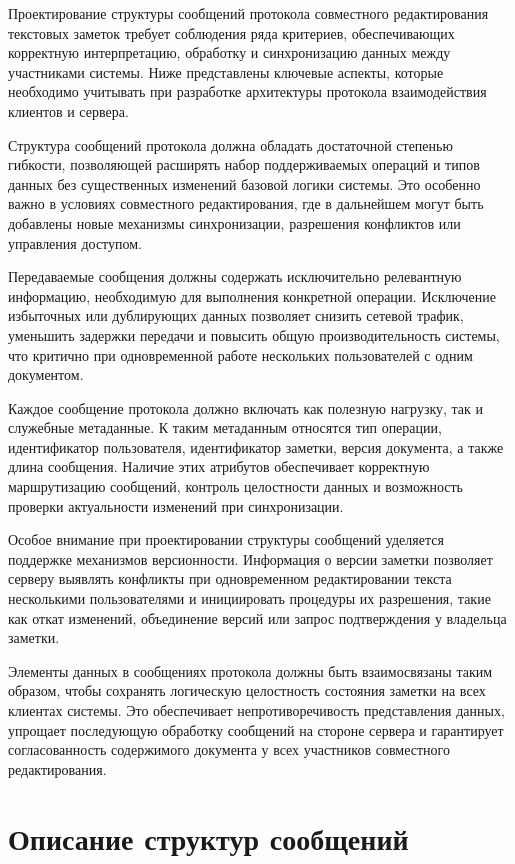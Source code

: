 Проектирование структуры сообщений протокола совместного редактирования текстовых заметок требует соблюдения ряда критериев, обеспечивающих корректную интерпретацию, обработку и синхронизацию данных между участниками системы. Ниже представлены ключевые аспекты, которые необходимо учитывать при разработке архитектуры протокола взаимодействия клиентов и сервера.

Структура сообщений протокола должна обладать достаточной степенью гибкости, позволяющей расширять набор поддерживаемых операций и типов данных без существенных изменений базовой логики системы. Это особенно важно в условиях совместного редактирования, где в дальнейшем могут быть добавлены новые механизмы синхронизации, разрешения конфликтов или управления доступом.

Передаваемые сообщения должны содержать исключительно релевантную информацию, необходимую для выполнения конкретной операции. Исключение избыточных или дублирующих данных позволяет снизить сетевой трафик, уменьшить задержки передачи и повысить общую производительность системы, что критично при одновременной работе нескольких пользователей с одним документом.

Каждое сообщение протокола должно включать как полезную нагрузку, так и служебные метаданные. К таким метаданным относятся тип операции, идентификатор пользователя, идентификатор заметки, версия документа, а также длина сообщения. Наличие этих атрибутов обеспечивает корректную маршрутизацию сообщений, контроль целостности данных и возможность проверки актуальности изменений при синхронизации.

Особое внимание при проектировании структуры сообщений уделяется поддержке механизмов версионности. Информация о версии заметки позволяет серверу выявлять конфликты при одновременном редактировании текста несколькими пользователями и инициировать процедуры их разрешения, такие как откат изменений, объединение версий или запрос подтверждения у владельца заметки.

Элементы данных в сообщениях протокола должны быть взаимосвязаны таким образом, чтобы сохранять логическую целостность состояния заметки на всех клиентах системы. Это обеспечивает непротиворечивость представления данных, упрощает последующую обработку сообщений на стороне сервера и гарантирует согласованность содержимого документа у всех участников совместного редактирования.

\section{Описание структур сообщений}

